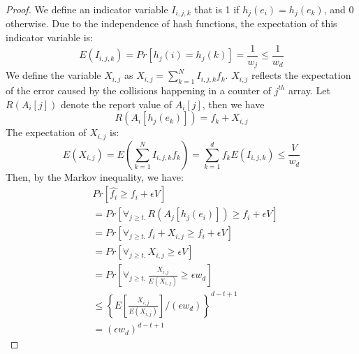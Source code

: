 \begin{proof}
We define an indicator variable $I_{i,j,k}$ that is 1 if $h_j(e_i)=h_j(e_k)$, and $0$ otherwise. 
Due to the independence of hash functions, the expectation of this indicator variable is:
\begin{equation}
E(I_{i,j,k})=Pr[h_j(i)=h_j(k)]=\frac{1}{w_j}\le \frac{1}{w_d}
\end{equation}
We define the variable $X_{i,j}$ as $X_{i,j}=\sum_{k=1}^{N}I_{i,j,k}f_k$.
$X_{i,j}$ reflects the expectation of the error caused by the collisions happening in a counter of $j^{th}$ array. Let $R(A_i[j])$ denote the report value of $A_i[j]$, then we have
\begin{equation}
R(A_i[h_j(e_k)])=f_k+X_{i,j}
\end{equation}
The expectation of $X_{i,j}$ is:
\begin{equation}
E(X_{i,j})=E(\sum_{k=1}^{N}I_{i,j,k}f_k)=\sum_{k=1}^{d}f_k E(I_{i,j,k}) \le \frac{V}{w_d}
\end{equation}
Then, by the Markov inequality, we have:
\begin{equation}
\begin{aligned}
&Pr\left[\hat{f_i} \ge f_i+\epsilon V\right] \\
&= Pr\left[\forall _{j \ge t .~} R(A_j[h_j(e_i)])\ge f_i+\epsilon V\right] \\
&= Pr\left[\forall _{j \ge t .~} f_i + X_{i,j}\ge f_i+\epsilon V\right] \\
&= Pr\left[\forall _{j \ge t .~} X_{i,j}\ge \epsilon V\right] \\
&= Pr\left[\forall _{j \ge t .~} \frac{X_{i,j}}{E(X_{i,j})}\ge \epsilon w_d\right] \\
&\le \left\{E\left[\frac{X_{i,j}}{E(X_{i,j})}\right]/(\epsilon w_d)\right\}^{d-t+1} \\
&= (\epsilon w_d)^{d-t+1}
\end{aligned}
\end{equation}
\end{proof}


